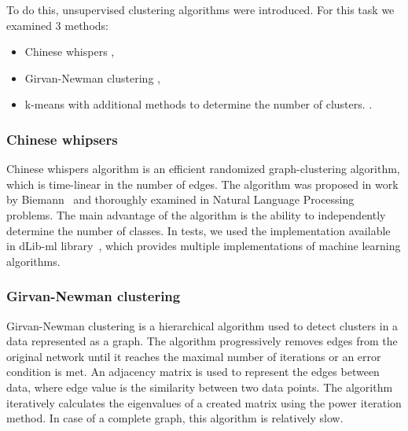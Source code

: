 To do this, unsupervised clustering algorithms were introduced. 
For this task we examined 3 methods:
\begin{itemize}
\item Chinese whispers \cite{CW1, CW2},
\item Girvan-Newman clustering \cite{Newman},
\item k-means with additional methods to determine the number of clusters. \cite{kmeans1, kmeans2}.
\end{itemize}

\subsubsection{Chinese whipsers}
Chinese whispers algorithm is an efficient randomized graph-clustering algorithm, which is time-linear in the number of edges.
The algorithm was proposed in work by Biemann~\cite{CW1} and thoroughly examined in Natural Language Processing problems. 
The main advantage of the algorithm is the ability to independently determine the number of classes. 
In tests, we used the implementation available in dLib-ml library~\cite{dlib}, which provides multiple implementations of machine learning algorithms.

\subsubsection{Girvan-Newman clustering}
Girvan-Newman clustering is a hierarchical algorithm used to detect clusters in a data represented as a graph.
The algorithm progressively removes edges from the original network until it reaches the maximal number of iterations or an error condition is met.
An adjacency matrix is used to represent the edges between data, where edge value is the similarity between two data points.
The algorithm iteratively calculates the eigenvalues of a created matrix using the power iteration method. 
In case of a complete graph, this algorithm is relatively slow.

